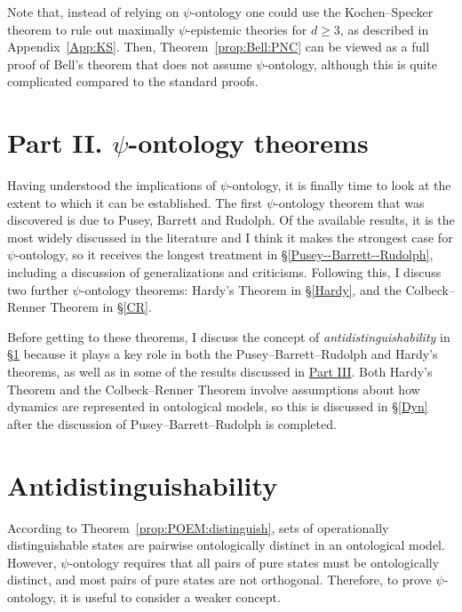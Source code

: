 \documentclass[DIV=calc,fontsize=12pt]{scrartcl} %
\theoremstyle{definition}
\theoremstyle{plain}
\begin{document}
Note that, instead of relying on $\psi$-ontology one could use the
Kochen--Specker theorem to rule out maximally $\psi$-epistemic theories
for $d \geq 3$, as described in Appendix~\ref{App:KS}.  Then,
Theorem~\ref{prop:Bell:PNC} can be viewed as a full proof of Bell's
theorem that does not assume $\psi$-ontology, although this is quite
complicated compared to the standard proofs.

\section*{Part II. $\psi$-ontology theorems\label{SPON}}

Having understood the implications of $\psi$-ontology, it is finally
time to look at the extent to which it can be established.  The first
$\psi$-ontology theorem that was discovered is due to Pusey, Barrett
and Rudolph. Of the available results, it is the most widely discussed
in the literature and I think it makes the strongest case for
$\psi$-ontology, so it receives the longest treatment in
\S\ref{Pusey--Barrett--Rudolph}, including a discussion of
generalizations and criticisms.  Following this, I discuss two further
$\psi$-ontology theorems: Hardy's Theorem in \S\ref{Hardy}, and the
Colbeck--Renner Theorem in \S\ref{CR}.

Before getting to these theorems, I discuss the concept of
\emph{antidistinguishability} in \S\ref{Anti} because it plays a key
role in both the Pusey--Barrett--Rudolph and Hardy's theorems, as well as in some
of the results discussed in \hyperref[Beyond]{Part III}. Both Hardy's Theorem and the Colbeck--Renner Theorem involve assumptions about how dynamics
are represented in ontological models, so this is discussed in
\S\ref{Dyn} after the discussion of Pusey--Barrett--Rudolph is completed.

\section{Antidistinguishability}

\label{Anti}

According to Theorem~\ref{prop:POEM:distinguish}, sets of
operationally distinguishable states are pairwise ontologically
distinct in an ontological model.  However, $\psi$-ontology requires
that all pairs of pure states must be ontologically distinct, and most
pairs of pure states are not orthogonal.  Therefore, to prove
$\psi$-ontology, it is useful to consider a weaker concept.
\end{document}
